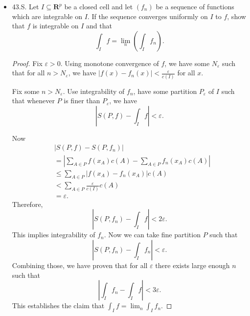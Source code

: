 \begin{itemize}
\item 43.S. Let $I \subseteq \boldsymbol{R}^p$ be a closed cell and let $\left(f_n\right)$ be a sequence of functions which are integrable on $I$. If the sequence converges uniformly on $I$ to $f$, show that $f$ is integrable on $I$ and that
\[
\int_I f=\lim _n\left(\int_I f_n\right) .
\]
\begin{proof}
	Fix $\varepsilon>0$. Using monotone convergence of $f$, we have some $N_\varepsilon$ such that for all $n> N_\varepsilon$, we have $|f(x) - f_n(x)| < \frac{\varepsilon}{c(I)}$ for all  $x$.

	Fix some $n > N_\varepsilon$. Use integrability of $f_n$, have some partition  $P_\varepsilon$ of $I$ such that whenever $P$ is finer than $P_\varepsilon$, we have
	\[
		|S(P, f) - \int _I f| < \varepsilon
	.\] 
	
	Now
	\begin{align*}
		&\left| S(P, f) - S(P, f_n) \right|  \\
		&= \left| \sum_{A \in P} f(x_A) c(A) -  \sum_{A \in P} f_n(x_A) c(A) \right|   \\
		&\le \sum_{A \in P} \left| f(x_A) - f_n(x_A) \right| c(A) \\
		&< \sum_{A \in P} \frac{\varepsilon}{c(I)} c(A) \\
		&= \varepsilon
	.\end{align*}
	Therefore, 
	\[
		\left| S(P, f_n) - \int _I f \right| < 2 \varepsilon
	.\] 
	This implies integrability of $f_n$. Now we can take fine partition $P$ such that 
	\[
		\left| S(P, f_n) - \int _I f_n \right| < \varepsilon
	.\] 
	Combining those, we have proven that for all $\varepsilon$ there exists large enough $n$ such that
	\[
		\left| \int _I f_n - \int _I f \right| < 3 \varepsilon
	.\] 
	This establishes the claim that $\int _I f = \lim _n \int _I f_n$.
\end{proof}

\end{itemize}

